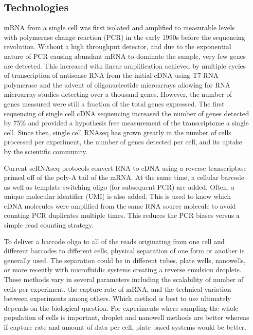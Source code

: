 \subsection{Technologies}

\par{
mRNA from a single cell was first isolated and amplified to measurable levels with polymerase change reaction (PCR)\cite{PCR}\cite{PCRPatent} in the early 1990s\cite{earliersinglecell} before the sequencing revolution. Without a high throughput detector, and due to the exponential nature of PCR causing abundant mRNA to dominate the sample, very few genes are detected. This increased with linear amplification achieved by multiple cycles of transcription of antisense RNA from the initial cDNA using T7 RNA polymerase\cite{T7amp} and the advent of oligonucleotide microarrays\cite{snpchip} allowing for RNA microarray studies detecting over a thousand genes\cite{microarrayRNA}\cite{microarraySC2}. However, the number of genes measured were still a fraction of the total genes expressed. The first sequencing of single cell cDNA sequencing increased the number of genes detected by 75\%\cite{first_singlecell} and provided a hypothesis free measurement of the transcriptome a single cell. Since then, single cell RNAseq has grown greatly in the number of cells processed per experiment, the number of genes detected per cell, and its uptake by the scientific community\cite{singlecellgrowth}.
}

\par{
Current scRNAseq protocols convert RNA to cDNA using a reverse transcriptase primed off of the poly-A tail of the mRNA. At the same time, a cellular barcode as well as template switching oligo (for subsequent PCR) are added. Often, a unique molecular identifier (UMI) is also added. This is used to know which cDNA molecules were amplified from the same RNA source molecule to avoid counting PCR duplicates multiple times\cite{UMI1}\cite{UMI2}. This reduces the PCR biases versus a simple read counting strategy. 
} \\

\par{
To deliver a barcode oligo to all of the reads originating from one cell and different barcodes to different cells, physical separation of one form or another is generally used. The separation could be in different tubes, plate wells, nanowells\cite{seqwell}\cite{scalablemicro}\cite{combilabel}, or more recently with microfluidic systems creating a reverse emulsion droplets\cite{dropseq}\cite{Klein2015}\cite{10xsinglecell}. These methods vary in several parameters including the scalability of number of cells per experiment, the capture rate of mRNA, and the technical variation between experiments among others\cite{powersingle}\cite{singlecompare}\cite{singlecompare2}. Which method is best to use ultimately depends on the biological question. For experiments where sampling the whole population of cells is important, droplet and nanowell methods are better whereas if capture rate and amount of data per cell, plate based systems would be better. 
}

